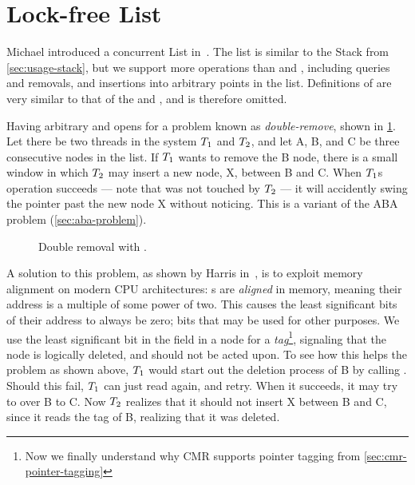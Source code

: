 \section{Lock-free List\label{sec:usage-list}}

Michael introduced a concurrent List in~\cite{harris2001pragmatic}. The list is similar to the
Stack from \cref{sec:usage-stack}, but we support more operations than  and ,
including queries and removals, and insertions into arbitrary points in the list. Definitions of
 are very similar to that of the  and , and is therefore
omitted.

Having arbitrary  and  opens for a problem known as \emph{double-remove},
shown in \cref{fig:list-remove}. Let there be two threads in the system $T\sb{1}$ and $T\sb{2}$,
and let A, B, and C be three consecutive nodes in the list. If $T\sb{1}$ wants to remove the B
node, there is a small window in which $T\sb{2}$ may insert a new node, X, between B and C. When
$T\sb{1}$s  operation succeeds --- note that  was not touched by $T\sb{2}$
--- it will accidently swing the pointer past the new node X without noticing. This is a variant of
the ABA problem (\cref{sec:aba-problem}).

\begin{figure}[ht]
\centering

\caption{Double removal with \label{fig:list-remove}.}
\end{figure}

A solution to this problem, as shown by Harris in~\cite{michael2002high}, is to exploit memory
alignment on modern CPU architectures: s are \emph{aligned} in memory, meaning their
address is a multiple of some power of two. This causes the least significant bits of their address
to always be zero; bits that may be used for other purposes. We use the least significant bit in
the  field in a node for a \emph{tag}\footnote{Now we finally understand why CMR
supports pointer tagging from \cref{sec:cmr-pointer-tagging}}, signaling that the node is logically
deleted, and should not be acted upon. To see how this helps the problem as shown above, $T\sb{1}$
would start out the deletion process of B by calling . Should
this fail, $T\sb{1}$ can just read  again, and retry. When it succeeds, it may try to
  over B to C. Now $T\sb{2}$ realizes that it should not insert X between B
and C, since it reads the tag of B, realizing that it was deleted.


